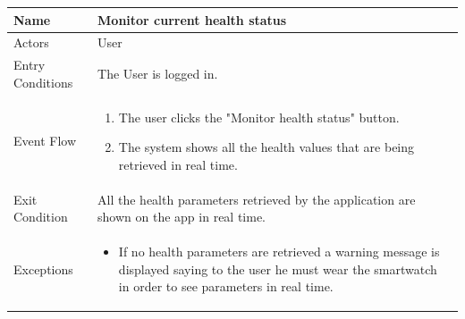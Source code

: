 \begin{enumerate}
\FloatBarrier
\begin{table}[h]
\begin{tabular}{|l|l|}
\hline
Name             & Monitor current health status \\ \hline
Actors           & User  \\ \hline
Entry Conditions & The User is logged in. \\ \hline
Event Flow       & \parbox{.45\textwidth}{\begin{enumerate}
            \item The user clicks the "Monitor health status" button.
            \item The system shows all the health values that are being retrieved in real time.
        \end{enumerate}}\\ \hline
Exit Condition   & All the health parameters retrieved by the application are shown on the app in real time.\\ \hline
Exceptions       & \parbox{.45\textwidth}  
{\begin{itemize}
\item If no health parameters are retrieved a warning message is displayed saying to the user he must wear the smartwatch in order to see parameters in real time. \end{itemize}}\\ \hline
\end{tabular}
\end{table}
\FloatBarrier


\end{enumerate}
